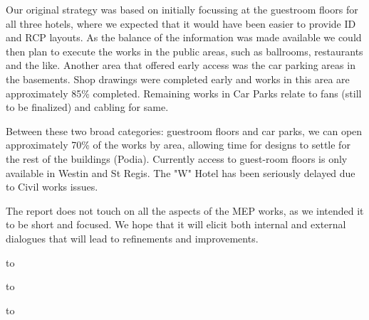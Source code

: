 Our original strategy was based on initially focussing at the guestroom floors for all three hotels, where we expected that it would have been easier to provide ID and RCP layouts. As the balance of the information was made available we could then plan to execute the works in the public areas, such as ballrooms, restaurants and the like. Another area that offered early access was the car parking areas in the basements. Shop drawings were completed early and works in this area are approximately 85\% completed. Remaining works in Car Parks relate to fans (still to be finalized) and cabling for same.

Between these two broad categories: guestroom floors and car parks,  we can open approximately 70\% of the works by area, allowing  time for designs to settle for the rest of the buildings (Podia). Currently access to guest-room floors is only available in Westin and St Regis. The "W" Hotel has been seriously delayed due to Civil works issues.

The report does not touch on all the aspects of the MEP works, as we intended it to be short and focused. We hope that it will elicit both internal and external dialogues that will lead to refinements and improvements. 
\bigskip

{\tt

 \hbox to 

 \hbox to 

\hbox to 
}
